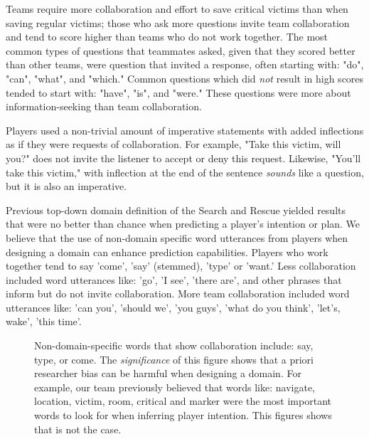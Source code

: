 Teams require more collaboration and effort to save critical victims than when saving regular victims; those who ask more questions invite team collaboration and tend to score higher than teams who do not work together. The most common types of questions that teammates asked, given that they scored better than other teams, were question that invited a response, often starting with: "do", "can", "what", and "which." Common questions which did \textit{not} result in high scores tended to start with: "have", "is", and "were." These questions were more about information-seeking than team collaboration.

Players used a non-trivial amount of imperative statements with added inflections as if they were requests of collaboration. For example, "Take this victim, will you?" does not invite the listener to accept or deny this request. Likewise, "You'll take this victim," with inflection at the end of the sentence \textit{sounds} like a question, but it is also an imperative. 




Previous top-down domain definition of the Search and Rescue yielded results that were no better than chance when predicting a player's intention or plan. We believe that the use of non-domain specific word utterances from players when designing a domain can enhance prediction capabilities. Players who work together tend to say 'come', 'say' (stemmed), 'type' or 'want.' Less collaboration included word utterances like: 'go', 'I see', 'there are', and other phrases that inform but do not invite collaboration. More team collaboration included word utterances like: 'can you', 'should we', 'you guys', 'what do you think', 'let's, wake', 'this time'. 


\begin{figure}[h!]
    \centering
    \caption{Non-domain-specific words that show collaboration include: say, type, or come. The \emph{significance} of this figure shows that a priori researcher bias can be harmful when designing a domain. For example, our team previously believed that words like: navigate, location, victim, room, critical and marker were the most important words to look for when inferring player intention. This figures shows that is not the case.}
    \end{figure}
    





